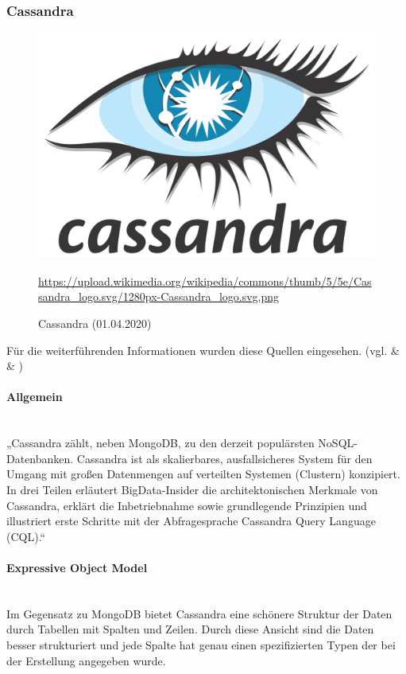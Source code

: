 \subsubsection{Cassandra}\label{ssec:Cassandra}
\begin{figure}[H]
\centering
  \includegraphics[scale=0.15]{images/Cassandra.png}
  \caption[Cassandra (01.04.2020)]{Cassandra (01.04.2020)}
  \label{fig:Cassandra}
  \url{https://upload.wikimedia.org/wikipedia/commons/thumb/5/5e/Cassandra_logo.svg/1280px-Cassandra_logo.svg.png}
\end{figure}
Für die weiterführenden Informationen wurden diese Quellen eingesehen. (vgl. \cite{scale_cassandra_2020} \&  \cite{bigdata_grundlagen_2020} \& \cite{jepsen_cassandra_2020})
\paragraph{Allgemein}\mbox{} \\
„Cassandra zählt, neben MongoDB, zu den derzeit populärsten NoSQL-Datenbanken. Cassandra ist als skalierbares, ausfallsicheres System für den Umgang mit großen Datenmengen auf verteilten Systemen (Clustern) konzipiert. In drei Teilen erläutert BigData-Insider die architektonischen Merkmale von Cassandra, erklärt die Inbetriebnahme sowie grundlegende Prinzipien und illustriert erste Schritte mit der Abfragesprache Cassandra Query Language (CQL).“~\cite{bigdata_grundlagen_2020}
\newpage
\paragraph{Expressive Object Model}\mbox{} \\
Im Gegensatz zu MongoDB bietet Cassandra eine schönere Struktur der Daten durch Tabellen mit Spalten und Zeilen. Durch diese Ansicht sind die Daten besser strukturiert und jede Spalte hat genau einen spezifizierten Typen der bei der Erstellung angegeben wurde.
